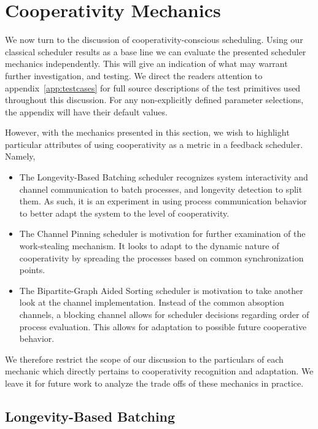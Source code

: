 \section{Cooperativity Mechanics}\label{sec:results-evaluation-feedback}

We now turn to the discussion of cooperativity-conscious scheduling.
Using our classical scheduler results as a base line we can evaluate 
the presented scheduler mechanics independently. This will give an indication of what
may warrant further investigation, and testing. We direct the readers attention
to appendix~\ref{app:testcases} for full source descriptions of the test 
primitives used throughout this discussion. For any non-explicitly defined
parameter selections, the appendix will have their default values.

However, with the mechanics presented in this section, we wish to highlight particular
attributes of using cooperativity as a metric in a feedback scheduler. Namely,
\begin{itemize}
    \item The Longevity-Based Batching scheduler recognizes system interactivity
        and channel communication to batch processes, and longevity detection to
        split them. As such, it is an experiment in using process communication
        behavior to better adapt the system to the level of cooperativity.

    \item The Channel Pinning scheduler is motivation for further examination of
        the work-stealing mechanism. It looks to adapt to the dynamic nature of
        cooperativity by spreading the processes based on common synchronization 
        points.

    \item The Bipartite-Graph Aided Sorting scheduler is motivation to take 
        another look at the channel implementation. Instead of the common 
        absoption channels, a blocking channel allows for scheduler decisions 
        regarding order of process evaluation. This allows for adaptation 
        to possible future cooperative behavior.
\end{itemize}
We therefore restrict the scope of our discussion to the particulars of
each mechanic which directly pertains to cooperativity recognition and
adaptation. We leave it for future work to analyze the trade offs of these
mechanics in practice.

\subsection{Longevity-Based Batching}\label{sec:results-longbatcher}

